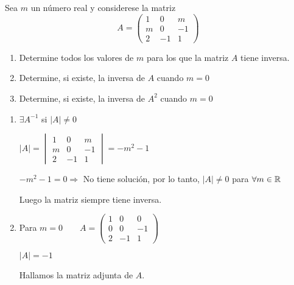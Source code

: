 \begin{ejemplo}
\end{ejemplo}

\begin{ejemplo}
Sea $m$ un número real y considerese la matriz 
\[ A=\begin{pmatrix}
1 & 0 & m \\
m & 0 & -1 \\
2 & -1 & 1
\end{pmatrix} \]
\begin{enumerate}[label=\alph* )]
\item Determine todos los valores de $m$ para los que la matriz $A$ tiene inversa.
\item Determine, si existe, la inversa de $A$ cuando $m=0$
\item Determine, si existe, la inversa de $A^2$ cuando $m=0$
\end{enumerate}

\tcblower

\begin{enumerate}[label=\alph* )]
\item $\exists A^{-1} $ si $|A| \neq 0$

$|A|=\begin{vmatrix}
1 & 0 & m \\
m & 0 & -1 \\
2 & -1 & 1
\end{vmatrix}=-m^2-1$

$-m^2-1 =0 \Rightarrow $ No tiene solución, por lo tanto, $|A| \neq 0$ para $\forall m \in \mathbb{R}$

Luego la matriz siempre tiene inversa.
\item Para $m=0 \qquad A=\begin{pmatrix}
1 & 0 & 0 \\
0 & 0 & -1 \\
2 & -1 & 1
\end{pmatrix} $

$|A|=-1 $

Hallamos la matriz adjunta de $A$.


\end{enumerate}
\end{ejemplo}
